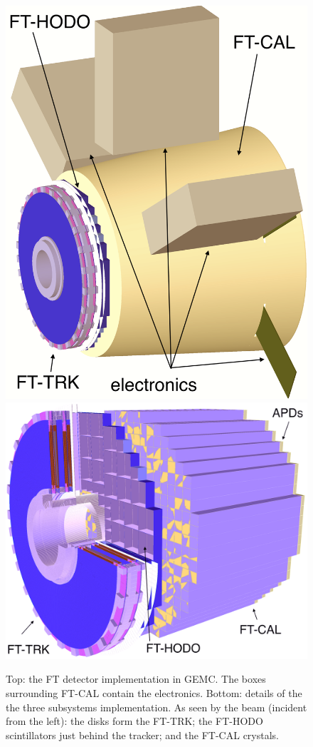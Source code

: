 \begin{figure}
	\centering
	\includegraphics[width=0.99\columnwidth,keepaspectratio]{img/ftGeometry.png}
	\includegraphics[width=0.99\columnwidth,keepaspectratio]{img/ftDetails.png}
	\caption{Top: the FT detector implementation in GEMC. The boxes surrounding FT-CAL contain the electronics.
			 Bottom: details of the the three subsystems implementation. As seen by the beam (incident from the left):
             the disks form the FT-TRK; the FT-HODO scintillators just behind the tracker;
			 and the FT-CAL crystals. }
	\label{fig:ftGeometry}
\end{figure}

